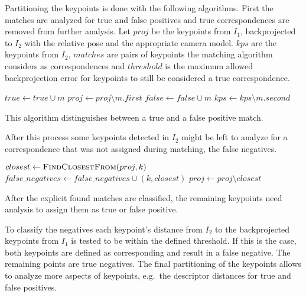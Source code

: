 Partitioning the keypoints is done with the following algorithms.
First the matches are analyzed for true and false positives and true correspondences are removed from further analysis. 
Let $proj$ be the keypoints from $I_1$, backprojected to $I_2$ with the relative pose and the appropriate camera model.
$kps$ are the keypoints from $I_2$, $matches$ are pairs of keypoints the matching algorithm considers as correspondences and $threshold$ is the maximum allowed backprojection error for keypoints to still be considered a true correspondence.
\begin{algorithm}[H]
\begin{algorithmic}[0]
        \State$true \gets true \cup m$
        \State$proj \gets proj \setminus m.first$
    \Else%
        \State$false \gets false \cup m$
    \EndIf%
    \State$kps \gets kps \setminus m.second$
    \EndFor%
    \EndFunction%
\end{algorithmic}
\caption{This algorithm distinguishes between a true and a false positive match.}
\end{algorithm}
After this process some keypoints detected in $I_2$ might be left to analyze for a correspondence that was not assigned during matching, the false negatives.
\begin{algorithm}[H]
\begin{algorithmic}
        \State$closest \gets \Call{FindClosestFrom}{proj, k}$
            \State$false\_negatives \gets false\_negatives \cup (k, closest)$
            \State$proj \gets proj \setminus closest$
        \EndIf
    \EndFor%
    \EndFunction%
\end{algorithmic}
\caption{After the explicit found matches are classified, the remaining keypoints need analysis to assign them as true or false positive.}
\end{algorithm}
To classify the negatives each keypoint's distance from $I_2$ to the backprojected keypoints from $I_1$ is tested to be within the defined threshold.
If this is the case, both keypoints are defined as corresponding and result in a false negative. The remaining points are true negatives.
The final partitioning of the keypoints allows to analyze more aspects of keypoints, e.g.~the descriptor distances for true and false positives.

